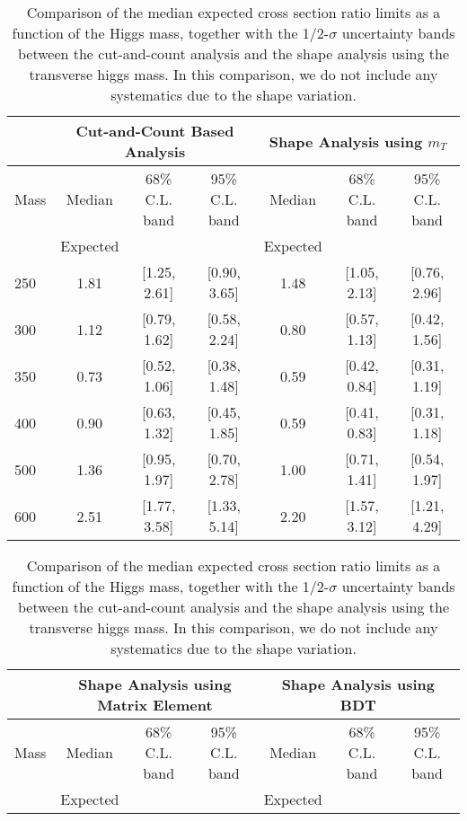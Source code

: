 \begin{table}[!ht]
\begin{center}
{\normalsize
\begin{tabular}{|l|c|c|c|c|c|c|}
\hline
      &  \multicolumn{3}{c|}{Cut-and-Count Based Analysis} &\multicolumn{3}{c|}{Shape Analysis using $m_T$} \\
\hline
Mass  &  Median      &     68\% C.L. band &  95\% C.L. band &  Median	   &	 68\% C.L. band &  95\% C.L. band\\
      &  Expected    &                    &                 &  Expected    &			&		 \\
\hline
250 & 1.81 & [1.25, 2.61] & [0.90, 3.65] & 1.48 & [1.05, 2.13] & [0.76, 2.96] \\
300 & 1.12 & [0.79, 1.62] & [0.58, 2.24] & 0.80 & [0.57, 1.13] & [0.42, 1.56] \\
350 & 0.73 & [0.52, 1.06] & [0.38, 1.48] & 0.59 & [0.42, 0.84] & [0.31, 1.19]\\
400 & 0.90 & [0.63, 1.32] & [0.45, 1.85] & 0.59 & [0.41, 0.83] & [0.31, 1.18]\\
500 & 1.36 & [0.95, 1.97] & [0.70, 2.78] & 1.00 & [0.71, 1.41] & [0.54, 1.97]\\
600 & 2.51 & [1.77, 3.58] & [1.33, 5.14] & 2.20 & [1.57, 3.12] & [1.21, 4.29]\\
\hline
\end{tabular}
}
\caption{Comparison of the median expected cross section ratio limits as a function 
of the Higgs mass, together with the 1/2-$\sigma$ uncertainty bands between the cut-and-count 
analysis and the shape analysis using the transverse higgs mass. In this comparison, we do not include any systematics due to 
the shape variation. }
\label{tab:mva_mtshapevscuts_hzz}
\end{center}
\begin{center}
{\normalsize
\begin{tabular}{|l|c|c|c|c|c|c|}
\hline
      &  \multicolumn{3}{c|}{Shape Analysis using Matrix Element} &\multicolumn{3}{c|}{Shape Analysis using BDT} \\
\hline
Mass  &  Median      &     68\% C.L. band &  95\% C.L. band &  Median	   &	 68\% C.L. band &  95\% C.L. band\\
      &  Expected    &                    &                 &  Expected    &			&		 \\

\end{tabular}}
\end{center}
\end{table}

